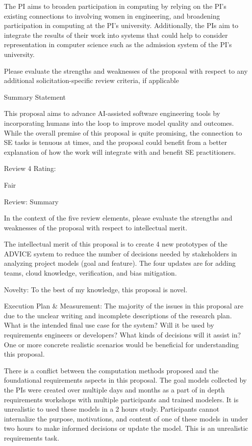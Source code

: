 The PI aims to broaden participation in computing by relying on the PI's existing connections to involving women in engineering, and broadening participation in computing at the PI’s university. Additionally, the PIs aim to integrate the results of their work into systems that could help to consider representation in computer science such as the admission system of the PI’s university.


Please evaluate the strengths and
weaknesses of the proposal with respect to any additional solicitation-specific review criteria, if
applicable



Summary Statement

This proposal aims to advance AI-assisted software engineering tools by incorporating humans into the loop to improve model quality and outcomes. While the overall premise of this proposal is quite promising, the connection to SE tasks is tenuous at times, and the proposal could benefit from a better explanation of how the work will integrate with and benefit SE practitioners.

Review 4
Rating:

Fair

Review:
Summary

In the context of the five review elements, please
evaluate the strengths and weaknesses of the proposal with respect to intellectual merit.

The intellectual merit of this proposal is to create 4 new prototypes of the ADVICE system to reduce the number of decisions needed by stakeholders in analyzing project models (goal and feature). The four updates are for adding teams, cloud knowledge, verification, and bias mitigation.

Novelty:
To the best of my knowledge, this proposal is novel.

Execution Plan & Measurement:
The majority of the issues in this proposal are due to the unclear writing and incomplete
descriptions of the research plan. What is the intended final use case for the system? Will it be used by requirements engineers or developers? What kinds of decisions will it assist in? One or more concrete realistic scenarios would be beneficial for understanding this proposal.

There is a conflict between the computation methods proposed and the foundational requirements aspects in this proposal. The goal models collected by the PIs were created over multiple days and months as a part of in depth requirements workshops with multiple participants and trained modelers. It is unrealistic to used these models in a 2 hours study. Participants cannot internalize the purpose, motivations, and content of one of these models in under two hours to make informed decisions or update the model. This is an unrealistic requirements task.

